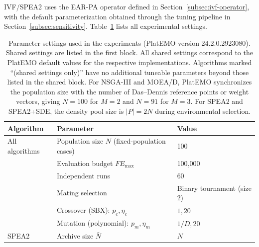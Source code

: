 \documentclass[pdflatex,sn-mathphys-ay]{sn-jnl}%
\theoremstyle{thmstyleone}%
\theoremstyle{thmstyletwo}%
\theoremstyle{thmstylethree}%
\begin{document}
IVF/SPEA2 uses the EAR-PA operator defined in Section~\ref{subsec:ivf-operator}, with the default parameterization obtained through the tuning pipeline in Section~\ref{subsec:sensitivity}. Table~\ref{tab:params} lists all experimental settings.

\begin{table}[!htbp]
	\caption{Parameter settings used in the experiments (PlatEMO version 24.2.0.2923080). Shared settings are listed in the first block. All shared settings correspond to the PlatEMO default values for the respective implementations. Algorithms marked ``(shared settings only)'' have no additional tuneable parameters beyond those listed in the shared block. For NSGA-III and MOEA/D, PlatEMO synchronizes the population size with the number of Das--Dennis reference points or weight vectors, giving $N=100$ for $M=2$ and $N=91$ for $M=3$. For SPEA2 and SPEA2+SDE, the density pool size is $|P|=2N$ during environmental selection.}\label{tab:params}
	\centering
	\small
	\renewcommand{\arraystretch}{1.05}
	\begin{tabularx}{\textwidth}{@{} l X X @{}}
		\toprule
		Algorithm          & Parameter                                      & Value                                                           \\
		\midrule
		All algorithms     & Population size $N$ (fixed-population cases)   & 100                                                             \\
		                   & Evaluation budget $FE_{\max}$                  & 100{,}000                                                       \\
		                   & Independent runs                               & 60                                                              \\
		                   & Mating selection                               & Binary tournament (size 2)                                      \\
		                   & Crossover (SBX): $p_c,\eta_c$                  & $1,20$                                                          \\
		                   & Mutation (polynomial): $p_m,\eta_m$            & $1/D,20$                                                        \\
		\midrule
		SPEA2              & Archive size $\bar{N}$                         & $N$                                                             \\

\end{tabularx}
\end{table}
\end{document}
